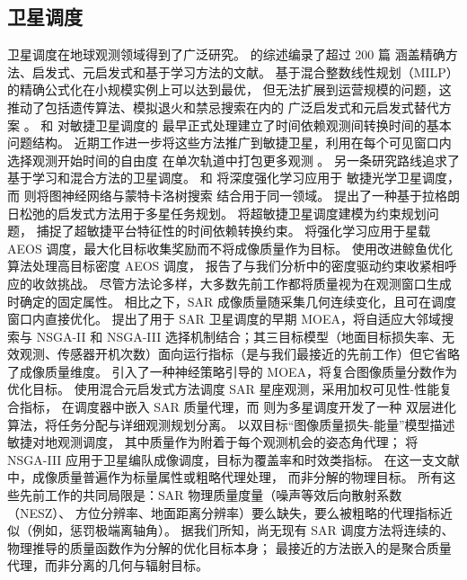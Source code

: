 \documentclass[preprint,12pt,authoryear]{elsarticle}
\begin{document}
\subsection{卫星调度}
卫星调度在地球观测领域得到了广泛研究。\citet{Ferrari2025} 的综述编录了超过 200 篇
涵盖精确方法、启发式、元启发式和基于学习方法的文献。
基于混合整数线性规划（MILP）的精确公式化在小规模实例上可以达到最优，
但无法扩展到运营规模的问题，这推动了包括遗传算法、模拟退火和禁忌搜索在内的
广泛启发式和元启发式替代方案 \citep{Wang2019MILP,Chen2019MILPMulti}。
\citet{Lemaitre2002MultiSat} 和 \citet{Bianchessi2007} 对敏捷卫星调度的
最早正式处理建立了时间依赖观测间转换时间的基本问题结构。
近期工作进一步将这些方法推广到敏捷卫星，利用在每个可见窗口内选择观测开始时间的自由度
在单次轨道中打包更多观测 \citep{Peng2019Orienteering,Chen2024LearnConstruct}。
另一条研究路线追求了基于学习和混合方法的卫星调度。
\citet{Liu2024TwoStageDRL} 和 \citet{Zhou2025TwoPhase} 将深度强化学习应用于
敏捷光学卫星调度，而 \citet{Jacquet2024GNN} 则将图神经网络与蒙特卡洛树搜索
结合用于同一领域。
\citet{Wang2026Lagrangian} 提出了一种基于拉格朗日松弛的启发式方法用于多星任务规划。
\citet{Caleiras2026SuperAgile} 将超敏捷卫星调度建模为约束规划问题，
捕捉了超敏捷平台特征性的时间依赖转换约束。
\citet{Herrmann2023} 将强化学习应用于星载 AEOS 调度，最大化目标收集奖励而不将成像质量作为目标。
\citet{Wu2026WhaleHighDensity} 使用改进鲸鱼优化算法处理高目标密度 AEOS 调度，
报告了与我们分析中的密度驱动约束收紧相呼应的收敛挑战。
尽管方法论多样，大多数先前工作都将质量视为在观测窗口生成时确定的固定属性。
相比之下，SAR 成像质量随采集几何连续变化，且可在调度窗口内直接优化。
\citet{Chang2022Gaofen} 提出了用于 SAR 卫星调度的早期 MOEA，将自适应大邻域搜索与 NSGA-II 和 NSGA-III 选择机制结合；其三目标模型（地面目标损失率、无效观测、传感器开机次数）面向运行指标（是与我们最接近的先前工作）但它省略了成像质量维度。
\citet{Wei2025MONP} 引入了一种神经策略引导的 MOEA，将复合图像质量分数作为优化目标。
\citet{Kramer2025SARVis} 使用混合元启发式方法调度 SAR 星座观测，采用加权可见性-性能复合指标，
在调度器中嵌入 SAR 质量代理，而 \citet{Yao2024Bilevel} 则为多星调度开发了一种
双层进化算法，将任务分配与详细观测规划分离。
\citet{ChangZhou2025Memetic} 以双目标“图像质量损失-能量”模型描述敏捷对地观测调度，
其中质量作为附着于每个观测机会的姿态角代理；
\citet{Wu2019NSGA3Formation} 将 NSGA-III 应用于卫星编队成像调度，目标为覆盖率和时效类指标。
在这一支文献中，成像质量普遍作为标量属性或粗略代理处理，
而非分解的物理目标。
所有这些先前工作的共同局限是：SAR 物理质量度量（噪声等效后向散射系数（NESZ）、
方位分辨率、地面距离分辨率）要么缺失，要么被粗略的代理指标近似（例如，惩罚极端离轴角）。
据我们所知，尚无现有 SAR 调度方法将连续的、物理推导的质量函数作为分解的优化目标本身；
最接近的方法嵌入的是聚合质量代理，而非分离的几何与辐射目标。
\end{document}
